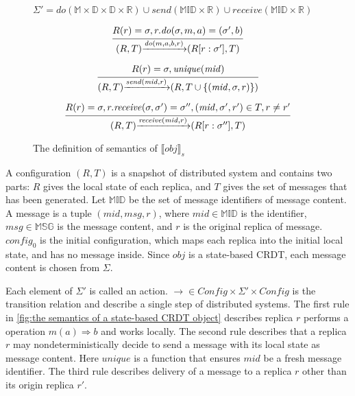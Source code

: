 {\begin{figure}[ht]
$\Sigma' = \mathit{do}(\mathbb{M} \times \mathbb{D} \times \mathbb{D} \times \mathbb{R}) \cup \mathit{send}(\mathbb{MID} \times \mathbb{R}) \cup \mathit{receive}(\mathbb{MID} \times \mathbb{R})$

\[
\begin{array}{l c}
\bigfrac{ R(r) = \sigma, r.\mathit{do}(\sigma,m,a) = (\sigma',b) }
{ (R,T) {\xrightarrow{\mathit{do}(m,a,b,r)}} (R[r:\sigma'],T) }
\end{array}
\]


\[
\begin{array}{l c}
\bigfrac{ R(r) = \sigma, \mathit{unique}(\mathit{mid}) }
{ (R,T) {\xrightarrow{\mathit{send}(\mathit{mid},r)}} (R,T \cup \{ (\mathit{mid},\sigma,r) \}) }
\end{array}
\]


\[
\begin{array}{l c}
\bigfrac{ R(r) = \sigma, r.\mathit{receive}(\sigma,\sigma') = \sigma'',(\mathit{mid},\sigma',r') \in T, r \neq r'}
{ (R,T) {\xrightarrow{\mathit{receive}(\mathit{mid},r)}} (R[r:\sigma''],T) }
\end{array}
\]
\caption{The definition of semantics of $\llbracket \mathit{obj} \rrbracket_s$}
\label{fig:the semantics of a state-based CRDT object}
\end{figure}

A configuration $(R,T)$ is a snapshot of distributed system and contains two parts: $R$ gives the local state of each replica, and $T$ gives the set of messages that has been generated. Let $\mathbb{MID}$ be the set of message identifiers of message content. A message is a tuple $(\mathit{mid},\mathit{msg},r)$, where $\mathit{mid} \in \mathbb{MID}$ is the identifier, $\mathit{msg} \in \mathbb{MSG}$ is the message content, and $r$ is the original replica of message. $\mathit{config}_0$ is the initial configuration, which maps each replica into the initial local state, and has no message inside. Since $\mathit{obj}$ is a state-based CRDT, each message content is chosen from $\Sigma$.

Each element of $\Sigma'$ is called an action. $\rightarrow \in \mathit{Config} \times \Sigma' \times \mathit{Config}$ is the transition relation and describe a single step of distributed systems. The first rule in \autoref{fig:the semantics of a state-based CRDT object} describes replica $r$ performs a operation $m(a) \Rightarrow b$ and works locally. The second rule describes that a replica $r$ may nondeterministically decide to send a message with its local state as message content. Here $\mathit{unique}$ is a function that ensures $\mathit{mid}$ be a fresh message identifier. The third rule describes delivery of a message to a replica $r$ other than its origin replica $r'$.

}
